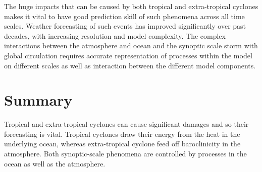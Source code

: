 The huge impacts that can be caused by both tropical and extra-tropical cyclones makes it vital to have good prediction skill of such phenomena across all time scales. Weather forecasting of such events has improved significantly over past decades, with increasing resolution and model complexity. The complex interactions between the atmosphere and ocean and the synoptic scale storm with global circulation requires accurate representation of processes within the model on different scales as well as interaction between the different model components.


\section{Summary}

Tropical and extra-tropical cyclones can cause significant damages and so their forecasting is vital. Tropical cyclones draw their energy from the heat in the underlying ocean, whereas extra-tropical cyclone feed off baroclinicity in the atmosphere. Both synoptic-scale phenomena are controlled by processes in the ocean as well as the atmosphere.






